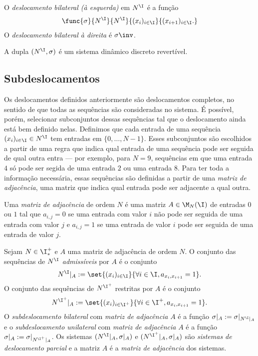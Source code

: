 \begin{definition}
O \emph{deslocamento bilateral (à esquerda)} em $N^\I$ é a função
	\begin{align*}
	\func{\sigma}{N^\I}{N^\I}{(x_i)_{i \in \I}}{(x_{i+1})_{i \in \I}.}
	\end{align*}
O \emph{deslocamento bilateral à direita} é $\sigma\inv$.
\end{definition}


\begin{proposition}
A dupla $(N^\I,\sigma)$ é um sistema dinâmico discreto revertível.
\end{proposition}

\subsection{Subdeslocamentos}

Os deslocamentos definidos anteriormente são deslocamentos completos, no sentido de que todas as sequências são consideradas no sistema. É possível, porém, selecionar subconjuntos dessas sequências tal que o deslocamento ainda está bem definido nelas. Definimos que cada entrada de uma sequência $(x_i)_{i \in \I} \in N^\I$ tem entradas em $\{0,\ldots,N-1\}$. Esses subconjuntos são escolhidos a partir de uma regra que indica qual entrada de uma sequência pode ser seguida de qual outra entra --- por exemplo, para $N=9$, sequências em que uma entrada $4$ só pode ser segida de uma entrada $2$ ou uma entrada $8$. Para ter toda a informação necessária, essas sequências são definidas a partir de uma \emph{matriz de adjacência}, uma matriz que indica qual entrada pode ser adjacente a qual outra.

\begin{definition}
Uma \emph{matriz de adjacência} de ordem $N$ é uma matriz $A \in \M_N(\I)$ de entradas $0$ ou $1$ tal que $a_{i,j}=0$ se uma entrada com valor $i$ não pode ser seguida de uma entrada com valor $j$ e $a_{i,j}=1$ se uma entrada de valor $i$ pode ser seguida de uma entrada de valor $j$.
\end{definition}

\begin{definition}
Sejam $N \in \I^+_*$ e $A$ uma matriz de adjacência de ordem $N$. O conjunto das sequências de $N^\I$ \emph{admissíveis} por $A$ é o conjunto
	\begin{equation*}
	N^\I|_A := \set{(x_i)_{i \in \I}}{\forall i \in \I, a_{x_i,x_{i+1}}=1}.
	\end{equation*}
O conjunto das sequências de $N^{\I^+}$ restritas por $A$ é o conjunto
	\begin{equation*}
	N^{\I^+}|_A := \set{(x_i)_{i \in {\I^+}}}{\forall i \in {\I^+}, a_{x_i,x_{i+1}}=1}.
	\end{equation*}
O \emph{subdeslocamento bilateral} com \emph{matriz de adjacência} $A$ é a função $\sigma|_A := \sigma|_{N^\I|_A}$ e o \emph{subdeslocamento unilateral} com \emph{matriz de adjacência} $A$ é a função $\sigma|_A := \sigma|_{N^{\I^+}|_A}$. Os sistemas $(N^\I|_A,\sigma|_A)$ e $(N^{\I^+}|_A,\sigma|_A)$ são \emph{sistemas de deslocamento parcial} e a matriz $A$ é a \emph{matriz de adjacência} dos sistemas.
\end{definition}

